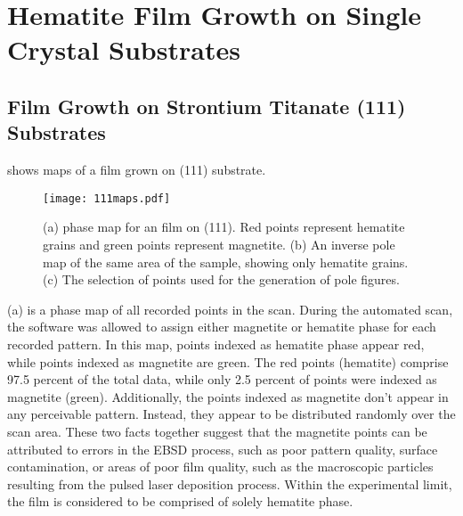 

\chapter{Hematite Film Growth on Single Crystal Substrates}
\label{ch:single.crystal.growth}




\section{Film Growth on Strontium Titanate (111) Substrates}
\label{sec:single.growth.111}


 shows  maps of a film grown on  (111) substrate. 
\begin{figure}
	\texttt{[image: 111maps.pdf]}
	\caption[ maps for film on  (111)]{%
		(a)  phase map for an  film on  
		(111). Red points represent hematite grains and green points 
		represent magnetite. (b) An inverse pole map of the same area 
		of the sample, showing only hematite grains. (c) The selection 
		of points used for the generation of pole figures.}
	\label{fig:111maps}
\end{figure}
(a) is a phase map of all recorded points in the scan. During the
automated scan, the  software was allowed to assign either magnetite or hematite phase
for each recorded pattern. In this map, points indexed as hematite phase appear red, while
points indexed as magnetite are green. The red points (hematite) comprise 97.5 percent of
the total data, while only 2.5 percent of points were indexed as magnetite (green).
Additionally, the points indexed as magnetite don't appear in any perceivable pattern.
Instead, they appear to be distributed randomly over the scan area. These two facts
together suggest that the magnetite points can be attributed to errors in the EBSD
process, such as poor pattern quality, surface contamination, or areas of poor film
quality, such as the macroscopic particles resulting from the pulsed laser deposition
process. Within the experimental limit, the film is considered to be comprised of solely
hematite phase. 

